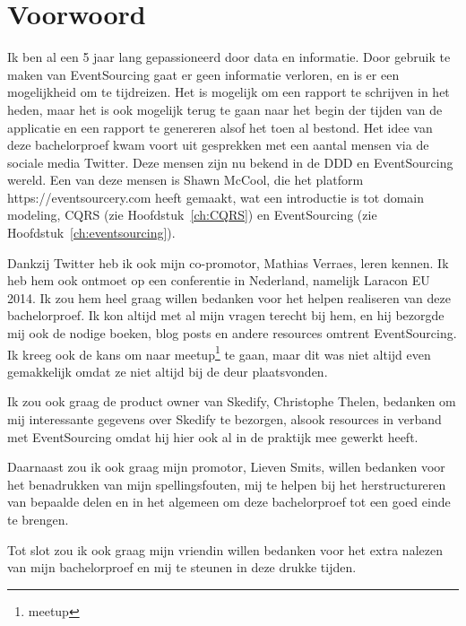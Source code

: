 
\chapter*{Voorwoord}
\label{ch:voorwoord}


Ik ben al een 5 jaar lang gepassioneerd door data en informatie. Door gebruik te maken van EventSourcing gaat er geen informatie verloren, en is er een mogelijkheid om te tijdreizen. Het is mogelijk om een rapport te schrijven in het heden, maar het is ook mogelijk terug te gaan naar het begin der tijden van de applicatie en een rapport te genereren alsof het toen al bestond. Het idee van deze bachelorproef kwam voort uit gesprekken met een aantal mensen via de sociale media Twitter. Deze mensen zijn nu bekend in de \gls{DDD} en EventSourcing wereld. Een van deze mensen is Shawn McCool, die het platform https://eventsourcery.com heeft gemaakt, wat een introductie is tot domain modeling, \gls{CQRS} (zie Hoofdstuk~\ref{ch:CQRS}) en EventSourcing (zie Hoofdstuk~\ref{ch:eventsourcing}).

Dankzij Twitter heb ik ook mijn co-promotor, Mathias Verraes, leren kennen. Ik heb hem ook ontmoet op een conferentie in Nederland, namelijk Laracon EU 2014. Ik zou hem heel graag willen bedanken voor het helpen realiseren van deze bachelorproef. Ik kon altijd met al mijn vragen terecht bij hem, en hij bezorgde mij ook de nodige boeken, blog posts en andere resources omtrent EventSourcing. Ik kreeg ook de kans om naar \gls{meetup}\footnote{\glsdesc{meetup}} te gaan, maar dit was niet altijd even gemakkelijk omdat ze niet altijd bij de deur plaatsvonden.

Ik zou ook graag de product owner van Skedify, Christophe Thelen, bedanken om mij interessante gegevens over Skedify te bezorgen, alsook resources in verband met EventSourcing omdat hij hier ook al in de praktijk mee gewerkt heeft.

Daarnaast zou ik ook graag mijn promotor, Lieven Smits, willen bedanken voor het benadrukken van mijn spellingsfouten, mij te helpen bij het herstructureren van bepaalde delen en in het algemeen om deze bachelorproef tot een goed einde te brengen.

Tot slot zou ik ook graag mijn vriendin willen bedanken voor het extra nalezen van mijn bachelorproef en mij te steunen in deze drukke tijden.